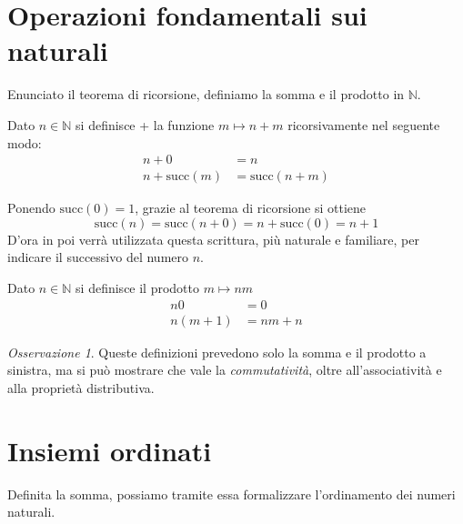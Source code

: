 \documentclass[oneside]{book}
\theoremstyle{remark}
\newtheorem*{osservaz}{Osservazione}
\begin{document}
\section{Operazioni fondamentali sui naturali}
Enunciato il teorema di ricorsione, definiamo la somma e il prodotto
in $\mathbb{N}$.
\begin{tcolorbox}[colback=yellow!30, colframe=yellow!30!black, title={Somma in $\mathbb{N}$}]
Dato $n\in\mathbb{N}$ si definisce + la funzione $m\mapsto n+m$ ricorsivamente
nel seguente modo:
\begin{align*}
    n + 0 &= n\\
    n + \text{succ}(m) &= \text{succ}(n + m)
\end{align*}
\end{tcolorbox}

Ponendo $\text{succ}(0) = 1$, grazie al teorema di ricorsione si ottiene
\[ \text{succ}(n) = \text{succ}(n + 0) = n + \text{succ}(0) = n + 1 \]
D'ora in poi verrà utilizzata questa scrittura, più naturale e familiare,
per indicare il successivo del numero $n$.

\begin{tcolorbox}[colback=yellow!30, colframe=yellow!30!black, title={Prodotto in $\mathbb{N}$}]
Dato $n\in\mathbb{N}$ si definisce il prodotto $m\mapsto nm$
\begin{align*}
    n0 &= 0\\
    n(m+1) &= nm + n
\end{align*}
\end{tcolorbox}

\begin{osservaz}
Queste definizioni prevedono solo la
somma e il prodotto a sinistra, ma si può mostrare che vale
la \textit{commutatività}, oltre all'associatività e alla
proprietà distributiva.
\end{osservaz}


\section{Insiemi ordinati}
Definita la somma, possiamo tramite essa formalizzare
l'ordinamento dei numeri naturali.
\end{document}
